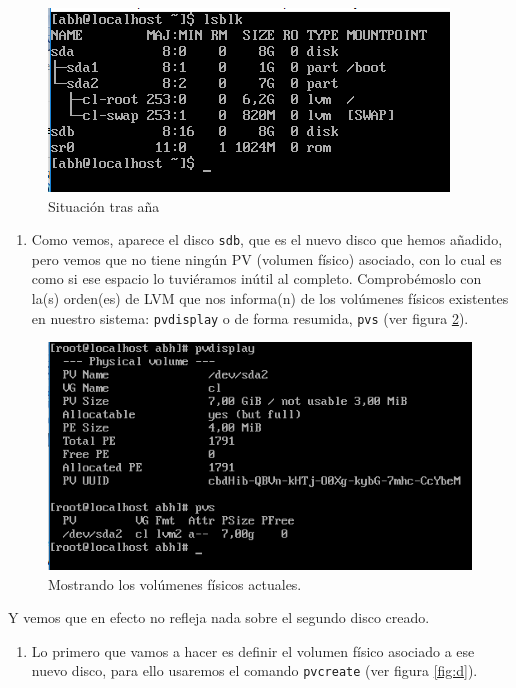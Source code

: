 \documentclass[
]{memoir}
\providecommand{\tightlist}{%
  \setlength{\itemsep}{0pt}\setlength{\parskip}{0pt}}
\begin{document}
\begin{figure}

{\centering \includegraphics[width=0.6\linewidth]{images/b} 

}

\caption{Situación tras aña}\label{fig:b}
\end{figure}

\begin{enumerate}
\def\labelenumi{\arabic{enumi}.}
\setcounter{enumi}{2}
\tightlist
\item
  Como vemos, aparece el disco \texttt{sdb}, que es el nuevo disco que hemos añadido, pero vemos que no tiene ningún PV (volumen físico) asociado, con lo cual es como si ese espacio lo tuviéramos inútil al completo. Comprobémoslo con la(s) orden(es) de LVM que nos informa(n) de los volúmenes físicos existentes en nuestro sistema: \texttt{pvdisplay} o de forma resumida, \texttt{pvs} (ver figura \ref{fig:c}).
\end{enumerate}

\begin{figure}

{\centering \includegraphics[width=0.6\linewidth]{images/c} 

}

\caption{Mostrando los volúmenes físicos actuales. }\label{fig:c}
\end{figure}

Y vemos que en efecto no refleja nada sobre el segundo disco creado.

\begin{enumerate}
\def\labelenumi{\arabic{enumi}.}
\setcounter{enumi}{3}
\tightlist
\item
  Lo primero que vamos a hacer es definir el volumen físico asociado a ese nuevo disco, para ello usaremos el comando \texttt{pvcreate} (ver figura \ref{fig:d}).
\end{enumerate}
\end{document}
